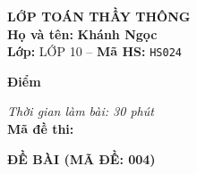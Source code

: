 \noindent
\begin{tcolorbox}[colback=white,colframe=black,arc=0mm,boxrule=0.8pt,top=4pt,bottom=4pt,left=6pt,right=6pt]
	\begin{minipage}[c]{0.44\textwidth}
		{\bfseries\large LỚP TOÁN THẦY THÔNG}\\[3pt]
		\textbf{Họ và tên:} \textbf{\large Khánh Ngọc}\\[3pt]
		\textbf{Lớp:} LỚP 10 \quad -- \quad \textbf{Mã HS:} \texttt{HS024}
	\end{minipage}
	\hfill
	\begin{minipage}[c]{0.22\textwidth}
		\begin{tcolorbox}[colback=white,colframe=black,arc=0mm,boxrule=0.6pt,height=1.8cm,halign=center,valign=top,top=2pt]
			{\bfseries\normalsize Điểm}
		\end{tcolorbox}
	\end{minipage}
	\hfill
	\begin{minipage}[c]{0.30\textwidth}
		\raggedleft
		\textit{Thời gian làm bài: 30 phút}\\[4pt]
		\textbf{Mã đề thi:} 
	\end{minipage}
\end{tcolorbox}
\vspace{0.25cm}

\noindent\textbf{\large ĐỀ BÀI (MÃ ĐỀ: 004)}
\vspace{0.1cm}

